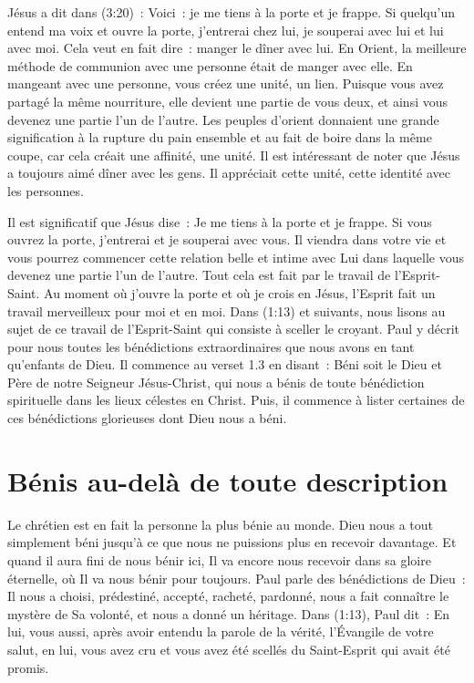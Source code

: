Jésus a dit dans (3:20)~:
 \og Voici~: je me tiens à la porte et je frappe.
 Si quelqu'un entend ma voix et ouvre la porte,
 j'entrerai chez lui, je souperai avec lui et lui avec moi. \fg{}
 Cela veut en fait dire~: \og manger le dîner avec lui. \fg{}
 En Orient, la meilleure méthode de communion avec une personne
 était de manger avec elle. En mangeant avec une personne,
 vous créez une unité, un lien.
 Puisque vous avez partagé la même nourriture, elle devient une partie
 de vous deux, et ainsi vous devenez une partie l'un de l'autre.
 Les peuples d'orient donnaient une grande signification à la rupture
 du pain ensemble et au fait de boire dans la même coupe,
 car cela créait une affinité, une unité.
 Il est intéressant de noter que Jésus a toujours aimé dîner avec les gens.
 Il appréciait cette unité, cette identité avec les personnes.


Il est significatif que Jésus dise~:
 \og Je me tiens à la porte et je frappe.
 Si vous ouvrez la porte, j'entrerai et je souperai avec vous. \fg{}
 Il viendra dans votre vie et vous pourrez commencer cette relation belle
 et intime avec Lui dans laquelle vous devenez une partie l'un de l'autre.
 Tout cela est fait par le travail de l'Esprit-Saint.
 Au moment où j'ouvre la porte et où je crois en Jésus,
 l'Esprit fait un travail merveilleux pour moi et en moi.
 Dans (1:13) et suivants, nous lisons au sujet de ce travail
 de l'Esprit-Saint qui consiste à sceller le croyant.
 Paul y décrit pour nous toutes les bénédictions extraordinaires
 que nous avons en tant qu'enfants de Dieu.
 Il commence au verset 1.3 en disant~:
 \og Béni soit le Dieu et Père de notre Seigneur Jésus-Christ,
 qui nous a bénis de toute bénédiction spirituelle
 dans les lieux célestes en Christ. \fg{}
 Puis, il commence à lister certaines de ces bénédictions glorieuses
 dont Dieu nous a béni.


\section*{Bénis au-delà de toute description}

Le chrétien est en fait la personne la plus bénie au monde.
 Dieu nous a tout simplement béni jusqu'à ce que nous ne puissions plus
 en recevoir davantage.
 Et quand il aura fini de nous bénir ici, Il va encore nous recevoir
 dans sa gloire éternelle, où Il va nous bénir pour toujours.
 Paul parle des bénédictions de Dieu~: Il nous a choisi, prédestiné,
 accepté, racheté, pardonné, nous a fait connaître
 le mystère de Sa volonté, et nous a donné un héritage.
 Dans (1:13), Paul dit~:
 \og En lui, vous aussi, après avoir entendu la parole de la vérité,
 l'Évangile de votre salut, en lui, vous avez cru et vous avez été scellés
 du Saint-Esprit qui avait été promis. \fg{}

